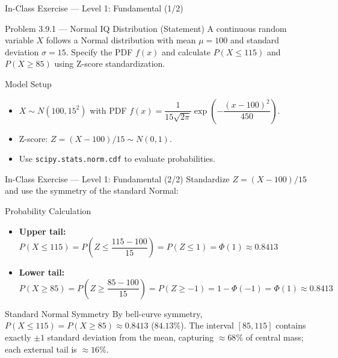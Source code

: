 \documentclass[aspectratio=169,xcolor={dvipsnames,table}]{beamer}
\begin{document}
\begin{frame}{In-Class Exercise --- Level 1: Fundamental (1/2)}
	\vspace{-0.1cm}
	\begin{block}{Problem 3.9.1 --- Normal IQ Distribution (Statement)}
		A continuous random variable $X$ follows a Normal distribution with mean $\mu = 100$ and standard deviation $\sigma = 15$. Specify the PDF $f(x)$ and calculate $P(X \le 115)$ and $P(X \ge 85)$ using Z-score standardization.
	\end{block}
	\vspace{0.15cm}
	\pause
	\begin{alertblock}{Model Setup}
		\begin{itemize}\itemsep=0.04cm
			\item $X \sim N(100, 15^{2})$ with PDF $f(x) = \dfrac{1}{15\sqrt{2\pi}} \exp\left(-\dfrac{(x-100)^{2}}{450}\right)$.
			\item Z-score: $Z = (X - 100)/15 \sim N(0, 1)$.
			\item Use \texttt{scipy.stats.norm.cdf} to evaluate probabilities.
		\end{itemize}
	\end{alertblock}
\end{frame}

\begin{frame}{In-Class Exercise --- Level 1: Fundamental (2/2)}
	\vspace{-0.05cm}
	\scriptsize
	Standardize $Z = (X - 100)/15$ and use the symmetry of the standard Normal: \pause
	\begin{block}{Probability Calculation}
		\begin{itemize}\itemsep=0.05cm
			\item \textbf{Upper tail:} $P(X \le 115) = P\left(Z \le \dfrac{115-100}{15}\right) = P(Z \le 1) = \Phi(1) \approx 0.8413$ \pause
			\item \textbf{Lower tail:} $P(X \ge 85) = P\left(Z \ge \dfrac{85-100}{15}\right) = P(Z \ge -1) = 1 - \Phi(-1) = \Phi(1) \approx 0.8413$
		\end{itemize}
	\end{block}
	\vspace{0.05cm}
	\pause
	\begin{alertblock}{Standard Normal Symmetry}
		\scriptsize
		By bell-curve symmetry, $P(X \le 115) = P(X \ge 85) \approx 0.8413$ ($84.13\%$). The interval $[85, 115]$ contains exactly $\pm 1$ standard deviation from the mean, capturing $\approx 68\%$ of central mass; each external tail is $\approx 16\%$.
	\end{alertblock}
\end{frame}
\end{document}
